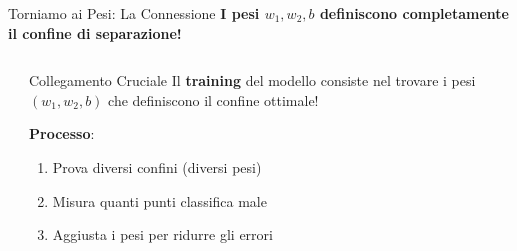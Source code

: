\documentclass[aspectratio=169]{beamer}
\begin{document}
%
%
\begin{frame}{Torniamo ai Pesi: La Connessione}
\textbf{I pesi $w_1, w_2, b$ definiscono completamente il confine di separazione!}

\vspace{0.5cm}

\begin{columns}
\begin{column}{0.5\textwidth}
\begin{center}
\end{center}
\end{column}
\begin{column}{0.5\textwidth}
\begin{alertblock}{Collegamento Cruciale}
Il \textbf{training} del modello consiste nel trovare i pesi $(w_1, w_2, b)$ che definiscono il confine ottimale!
\end{alertblock}

\textbf{Processo}:
\begin{enumerate}
    \item Prova diversi confini (diversi pesi)
    \item Misura quanti punti classifica male
    \item Aggiusta i pesi per ridurre gli errori
\end{enumerate}
\end{column}
\end{columns}
\end{frame}
%
%
\end{document}
